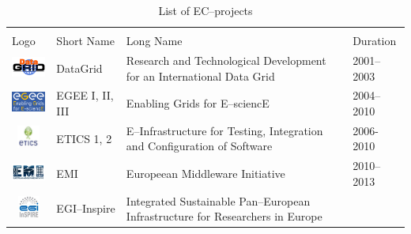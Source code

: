 \documentclass[journal]{IEEEtran}
\begin{document}
\begin{table}[!h]
\renewcommand{\arraystretch}{1.3}
\caption{List of EC--projects}
\label{tab:eup}
\centering
\begin{tabular}{p{1.6cm}p{1.5cm}p{3cm}l}
\hline
\hline
\\
Logo & Short Name & Long Name & Duration\\
\hline
\hline
\begin{minipage}{.3\textwidth}
\includegraphics[width=15mm,height=7.5mm]{images/datagrid}
\end{minipage}
    & DataGrid &
Research and Technological Development for an International Data Grid & 2001--2003\\
\begin{minipage}{.3\textwidth}
\includegraphics[width=15mm,height=7.5mm]{images/egee}
\end{minipage}
     & EGEE I, II, III &
Enabling Grids for E--sciencE & 2004--2010\\
\begin{minipage}{.3\textwidth}
\includegraphics[width=15mm,height=7.5mm]{images/etics}
\end{minipage}
     & ETICS 1, 2 &
E--Infrastructure for Testing, Integration and Configuration of Software & 2006-2010\\
\begin{minipage}{.3\textwidth}
\includegraphics[width=15mm,height=7.5mm]{images/emi}
\end{minipage}
     & EMI &
Europeean Middleware Initiative & 2010--2013\\
\begin{minipage}{.3\textwidth}
\includegraphics[width=15mm,height=7.5mm]{images/egi-inspire}
\end{minipage}
     & EGI--Inspire &
Integrated Sustainable Pan--European Infrastructure for Researchers in Europe

\end{tabular}
\end{table}
\end{document}
